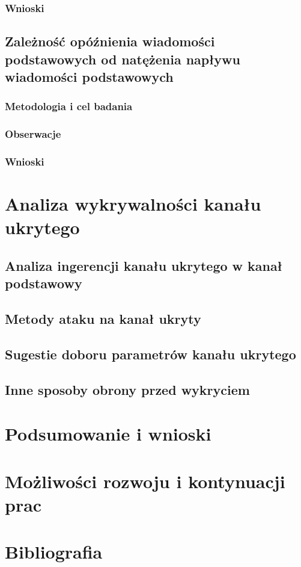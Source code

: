 \documentclass[a4paper]{report}
\begin{document}
        \subsection{Wnioski}

    \section{Zależność opóźnienia wiadomości podstawowych od natężenia napływu wiadomości podstawowych}
        \subsection{Metodologia i cel badania}
        \subsection{Obserwacje}
        \subsection{Wnioski}


\chapter{Analiza wykrywalności kanału ukrytego}
    \section{Analiza ingerencji kanału ukrytego w kanał podstawowy}
    \section{Metody ataku na kanał ukryty}
    \section{Sugestie doboru parametrów kanału ukrytego}
    \section{Inne sposoby obrony przed wykryciem}

\chapter{Podsumowanie i wnioski}
\chapter{Możliwości rozwoju i kontynuacji prac}
\chapter{Bibliografia}
\end{document}
